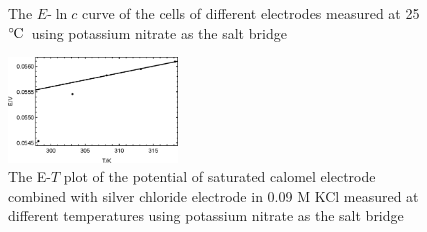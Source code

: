 \documentclass[%
 reprint,
 amsmath,amssymb,
 aps,
10.5pt,
]{revtex4-1}
\newcommand{\celsius}{\ensuremath{^\circ\hspace{-0.09em}\mathrm{C}}}
\begin{document}
\begin{figure}
\centering
{}
\caption{The $E$-$\ln{c}$ curve of the cells of different electrodes measured at 25 \celsius~using potassium nitrate as the salt bridge}
\label{figure}
\end{figure}

\begin{figure}
\centering
\includegraphics[width=0.4\textwidth]{figures/batterytemp.eps}
\caption{The E-$T$ plot of the potential of saturated calomel electrode combined with silver chloride electrode in 0.09 M KCl measured at different temperatures using potassium nitrate as the salt bridge}
\label{batterytemp}
\end{figure}
\end{document}
